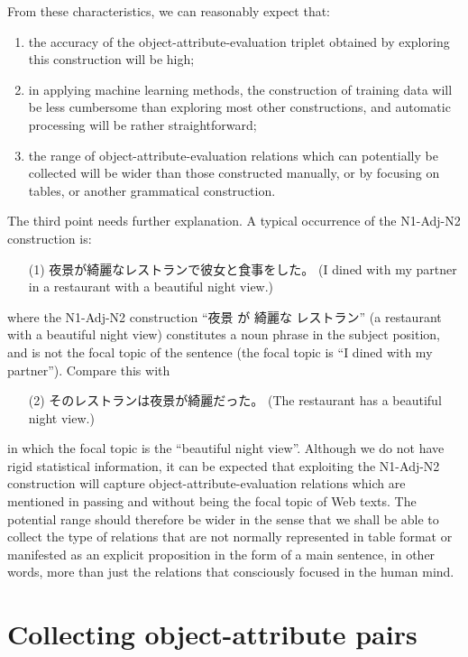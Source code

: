 \documentclass[english]{jnlp_1.4}
\begin{document}
From these characteristics, we can reasonably expect that:
\begin{enumerate}
\item the accuracy of the object-attribute-evaluation triplet obtained
by exploring this construction will be high;
\item in applying machine learning methods, the construction of training 
data will be less cumbersome than exploring most other constructions, and 
automatic processing will be rather straightforward;
\item the range of object-attribute-evaluation relations which can potentially
be collected will be wider than those constructed manually,
or by focusing on tables, or another grammatical construction.
\end{enumerate}
The third point needs further explanation. A typical occurrence 
of the N1-Adj-N2 construction is:
\begin{enumerate}
\item[(1)] 夜景が綺麗なレストランで彼女と食事をした。
(I dined with my partner in a restaurant with a beautiful night view.)
\end{enumerate}
where the N1-Adj-N2 construction ``夜景 が 綺麗な レストラン'' (a restaurant
with a beautiful night view) constitutes a noun phrase in the subject 
position, and is not the focal topic of the sentence (the focal topic
is ``I dined with my partner''). Compare this with 
\begin{enumerate}
\item[(2)] そのレストランは夜景が綺麗だった。
(The restaurant has a beautiful night view.)
\end{enumerate}
in which the focal topic is the ``beautiful night view''. Although we do
not have rigid statistical information, it can be expected that exploiting
the N1-Adj-N2 construction will capture object-attribute-evaluation relations
which are mentioned in passing and without being the focal topic of 
Web texts. The potential range should therefore be wider in the sense
that we shall be able to collect the type of relations that are not normally 
represented in table format or manifested as an explicit proposition in
the form of a main sentence, in other words, more than just the relations 
that consciously focused in the human mind.


\section{Collecting object-attribute pairs}
\end{document}

